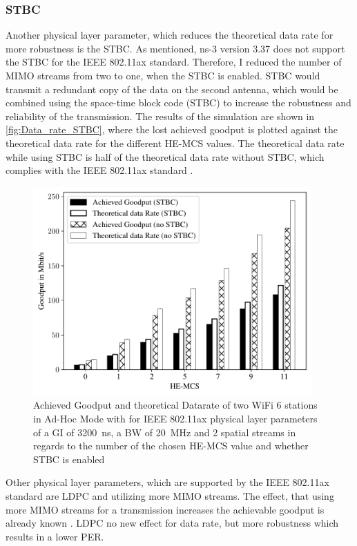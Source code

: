\subsubsection*{\acf{STBC}}
Another physical layer parameter, which reduces the theoretical data rate for more robustness is the \ac{STBC}.
As mentioned, ns-3 version 3.37 does not support the \ac{STBC} for the IEEE 802.11ax standard.
Therefore, I reduced the number of
\ac{MIMO} streams from two to one, when the \ac{STBC} is enabled. \ac{STBC} would transmit a redundant copy of the data on the second antenna, which would be combined
using the space-time block code (STBC) to increase the robustness and reliability of the transmission.
The results of the simulation are shown in \autoref{fig:Data_rate_STBC}, where the lost achieved goodput is plotted against
the theoretical data rate for the different HE-\ac{MCS} values.
The theoretical data rate while using \ac{STBC} is half of the theoretical data rate without \ac{STBC},
which complies with the IEEE 802.11ax standard \cite{noauthor_ieee_2021}.
\begin{figure}[H]%
	\centering
	\includegraphics[width=0.95\textwidth]{figures/STBC_dataRate_simulation}
	\caption{Achieved Goodput and theoretical Datarate of two WiFi 6 stations in Ad-Hoc Mode with for IEEE 802.11ax physical layer parameters of a \acf{GI} of \SI{3200}{\nano\second}, a \acf{BW} of \SI{20}{\mega\hertz} and 2 spatial streams  in regards to the number of the chosen HE-\acf{MCS} value and whether \acf{STBC} is enabled}%
	\label{fig:Data_rate_STBC}%
\end{figure}

Other physical layer parameters, which are supported by the IEEE 802.11ax standard are \ac{LDPC} and utilizing more \ac{MIMO} streams.
The effect, that using more \ac{MIMO} streams for a transmission increases the achievable goodput
is already known \cite{sauter_wireless_2022, noauthor_ieee_2021, noauthor_ieee_2021-1}.
\ac{LDPC} no new effect for data rate, but more robustness which results in a lower \ac{PER}.


